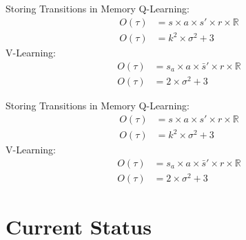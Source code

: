 \documentclass[aspectratio=169, 11pt, invertlogo]{ismll-slides}
\begin{document}

\begin{frame}[fragile]{Storing Transitions in Memory}
	Q-Learning:
	\begin{align*}
		O(\tau) &= s \times a \times s' \times r \times \mathbb{R} \\
		O(\tau) &= k^2 \times \sigma^2 + 3
	\end{align*}
	V-Learning:
	\begin{align*}
		O(\tau) &= s_a \times a \times \bar s' \times r \times \mathbb{R} \\
		O(\tau) &= 2 \times \sigma^2 + 3
	\end{align*}
\end{frame}



\begin{frame}[fragile]{Storing Transitions in Memory}
	Q-Learning:
	\begin{align*}
	O(\tau) &= s \times a \times s' \times r \times \mathbb{R} \\
	O(\tau) &= k^2 \times \sigma^2 + 3
	\end{align*}
	V-Learning:
	\begin{align*}
	O(\tau) &= s_a \times a \times \bar s' \times r \times \mathbb{R} \\
	O(\tau) &= 2 \times \sigma^2 + 3
	\end{align*}
\end{frame}



\section{Current Status}
\end{document}
